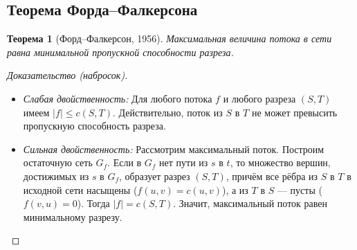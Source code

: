 \documentclass[12pt]{article}
\newtheorem{theorem}{Теорема}
\begin{document}
\begin{enumerate}
\subsection{Теорема Форда–Фалкерсона}
\begin{theorem}[Форд–Фалкерсон, 1956]
    Максимальная величина потока в сети равна минимальной пропускной способности разреза.
\end{theorem}
\begin{proof}[Доказательство (набросок)]
    \begin{itemize}
        \item \textit{Слабая двойственность:} Для любого потока \(f\) и любого разреза \((S,T)\) имеем \(|f| \le c(S,T)\). Действительно, поток из \(S\) в \(T\) не может превысить пропускную способность разреза.
        \item \textit{Сильная двойственность:} Рассмотрим максимальный поток. Построим остаточную сеть \(G_f\). Если в \(G_f\) нет пути из \(s\) в \(t\), то множество вершин, достижимых из \(s\) в \(G_f\), образует разрез \((S,T)\), причём все рёбра из \(S\) в \(T\) в исходной сети насыщены (\(f(u,v)=c(u,v)\)), а из \(T\) в \(S\) — пусты (\(f(v,u)=0\)). Тогда \(|f| = c(S,T)\). Значит, максимальный поток равен минимальному разрезу.
    \end{itemize}
\end{proof}


\end{enumerate}
\end{document}
